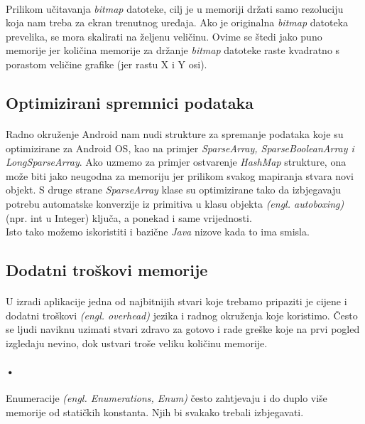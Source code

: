 \documentclass[times, utf8, zavrsni]{fer}
\begin{document}
\paragraph{}
Prilikom učitavanja \textit{bitmap} datoteke, cilj je u memoriji držati samo rezoluciju koja nam treba za ekran trenutnog uređaja. Ako je originalna \textit{bitmap} datoteka prevelika, se mora skalirati na željenu veličinu. Ovime se štedi jako puno memorije jer količina memorije za držanje \textit{bitmap} datoteke raste kvadratno s porastom veličine grafike (jer rastu X i Y osi).

\subsection{Optimizirani spremnici podataka}
\paragraph{}
Radno okruženje Android nam nudi strukture za spremanje podataka koje su optimizirane za Android OS, kao na primjer \textit{SparseArray, SparseBooleanArray i LongSparseArray}. Ako uzmemo za primjer ostvarenje \textit{HashMap} strukture, ona može biti jako neugodna za memoriju jer prilikom svakog mapiranja stvara novi objekt. S druge strane \textit{SparseArray} klase su optimizirane tako da izbjegavaju potrebu automatske konverzije iz primitiva u klasu objekta \textit{(engl. autoboxing)}(npr. int u Integer) ključa, a ponekad i same vrijednosti.\\

Isto tako možemo iskoristiti i bazične \textit{Java} nizove kada to ima smisla.

\subsection{Dodatni troškovi memorije}
\paragraph{}
U izradi aplikacije jedna od najbitnijih stvari koje trebamo pripaziti je cijene i dodatni troškovi \textit{(engl. overhead)} jezika i radnog okruženja koje koristimo. Često se ljudi naviknu uzimati stvari zdravo za gotovo i rade greške koje na prvi pogled izgledaju nevino, dok ustvari troše veliku količinu memorije.

\paragraph{•}
Enumeracije \textit{(engl. Enumerations, Enum)} često zahtjevaju i do duplo više memorije od statičkih konstanta. Njih bi svakako trebali izbjegavati.
\end{document}
